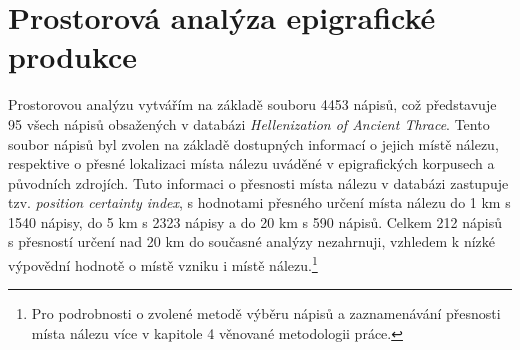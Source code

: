 
\section[prostorová-analýza-epigrafické-produkce]{Prostorová analýza epigrafické produkce}

Prostorovou analýzu vytvářím na základě souboru 4453 nápisů, což představuje 95  všech nápisů obsažených v databázi {\em Hellenization of Ancient Thrace}. Tento soubor nápisů byl zvolen na základě dostupných informací o jejich místě nálezu, respektive o přesné lokalizaci místa nálezu uváděné v epigrafických korpusech a původních zdrojích. Tuto informaci o přesnosti místa nálezu v databázi zastupuje tzv. {\em position certainty index}, s hodnotami přesného určení místa nálezu do 1 km s 1540 nápisy, do 5 km s 2323 nápisy a do 20 km s 590 nápisů. Celkem 212 nápisů s přesností určení nad 20 km do současné analýzy nezahrnuji, vzhledem k nízké výpovědní hodnotě o místě vzniku i místě nálezu.\footnote{Pro podrobnosti o zvolené metodě výběru nápisů a zaznamenávání přesnosti místa nálezu více v kapitole 4 věnované metodologii práce.}

